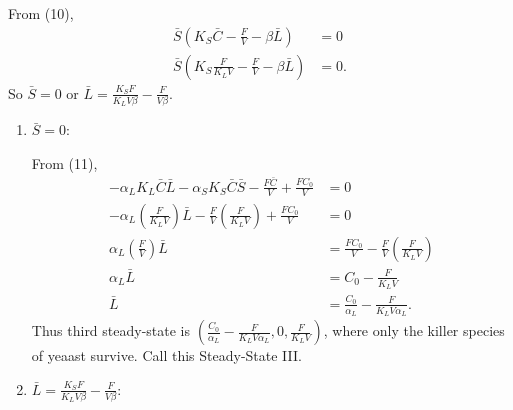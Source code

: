   From (10), 
  \begin{align*}
    \bar{S}\left( K_S \bar{C} - \frac{F}{V} - \beta \bar{L} \right) &= 0 \\
    \bar{S}\left( K_S \frac{F}{K_L V} - \frac{F}{V} - \beta \bar{L} \right) &= 0.
  \end{align*}
  So $\bar{S} = 0$ or $\bar{L} = \frac{K_S F}{K_L V \beta} - \frac{F}{V \beta}$.
  
  \begin{enumerate}

    \item $\bar{S} = 0$:
      
    From (11), 
    \begin{align*}
      -\alpha_L K_L \bar{C}\bar{L} -\alpha_S K_S \bar{C}\bar{S} - \frac{F\bar{C}}{V} + \frac{FC_0}{V} &= 0 \\
      -\alpha_L \left( \frac{F}{K_L V} \right) \bar{L} - \frac{F}{V} \left( \frac{F}{K_L V} \right) + \frac{FC_0}{V} &= 0 \\
      \alpha_L \left( \frac{F}{V} \right) \bar{L} &= \frac{FC_0}{V} - \frac{F}{V} \left( \frac{F}{K_L V} \right) \\
      \alpha_L \bar{L} &= C_0 - \frac{F}{K_L V} \\
      \bar{L} &= \frac{C_0}{\alpha_L} - \frac{F}{K_L V \alpha_L}.
    \end{align*}
    Thus third steady-state is {\color{red}$\left( \frac{C_0}{\alpha_L} - \frac{F}{K_L V \alpha_L}, 0, \frac{F}{K_L V} \right)$}, where only the killer species of yeaast survive.  Call this {\color{red}Steady-State III}.

    \item $\bar{L} = \frac{K_S F}{K_L V \beta} - \frac{F}{V \beta}$:


\end{enumerate}
